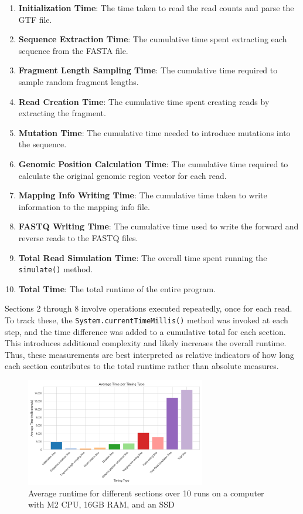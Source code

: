 \documentclass{article}
\begin{document}
    \begin{enumerate}
        \item \textbf{Initialization Time}: The time taken to read the read counts and parse the GTF file.
        \item \textbf{Sequence Extraction Time}: The cumulative time spent extracting each sequence from the FASTA file.
        \item \textbf{Fragment Length Sampling Time}: The cumulative time required to sample random fragment lengths.
        \item \textbf{Read Creation Time}: The cumulative time spent creating reads by extracting the fragment.
        \item \textbf{Mutation Time}: The cumulative time needed to introduce mutations into the sequence.
        \item \textbf{Genomic Position Calculation Time}: The cumulative time required to calculate the original genomic region vector for each read.
        \item \textbf{Mapping Info Writing Time}: The cumulative time taken to write information to the mapping info file.
        \item \textbf{FASTQ Writing Time}: The cumulative time used to write the forward and reverse reads to the FASTQ files.
        \item \textbf{Total Read Simulation Time}: The overall time spent running the \texttt{simulate()} method.
        \item \textbf{Total Time}: The total runtime of the entire program.
    \end{enumerate}

    Sections 2 through 8 involve operations executed repeatedly, once for each read. To track these, the \texttt{System.currentTimeMillis()} method was invoked at each step, and the time difference was added to a cumulative total for each section. This introduces additional complexity and likely increases the overall runtime. Thus, these measurements are best interpreted as relative indicators of how long each section contributes to the total runtime rather than absolute measures.

    \begin{figure}
        \centering
        \includegraphics[width=0.7\textwidth]{figures/readsimulator/average_time_per_timing_type}
        \caption{Average runtime for different sections over 10 runs on a computer with M2 CPU, 16GB RAM, and an SSD}
        \label{fig:runtime}
    \end{figure}
\end{document}
